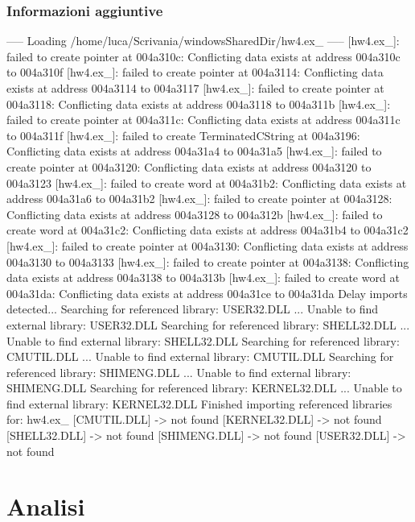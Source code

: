 \documentclass[a4paper, 12pt]{article}
\begin{document}
\subsubsection{Informazioni aggiuntive}
\begin{spverbatim}
----- Loading /home/luca/Scrivania/windowsSharedDir/hw4.ex_ -----
[hw4.ex_]: failed to create pointer at 004a310c: Conflicting data exists at address 004a310c to 004a310f
[hw4.ex_]: failed to create pointer at 004a3114: Conflicting data exists at address 004a3114 to 004a3117
[hw4.ex_]: failed to create pointer at 004a3118: Conflicting data exists at address 004a3118 to 004a311b
[hw4.ex_]: failed to create pointer at 004a311c: Conflicting data exists at address 004a311c to 004a311f
[hw4.ex_]: failed to create TerminatedCString at 004a3196: Conflicting data exists at address 004a31a4 to 004a31a5
[hw4.ex_]: failed to create pointer at 004a3120: Conflicting data exists at address 004a3120 to 004a3123
[hw4.ex_]: failed to create word at 004a31b2: Conflicting data exists at address 004a31a6 to 004a31b2
[hw4.ex_]: failed to create pointer at 004a3128: Conflicting data exists at address 004a3128 to 004a312b
[hw4.ex_]: failed to create word at 004a31c2: Conflicting data exists at address 004a31b4 to 004a31c2
[hw4.ex_]: failed to create pointer at 004a3130: Conflicting data exists at address 004a3130 to 004a3133
[hw4.ex_]: failed to create pointer at 004a3138: Conflicting data exists at address 004a3138 to 004a313b
[hw4.ex_]: failed to create word at 004a31da: Conflicting data exists at address 004a31ce to 004a31da
Delay imports detected...
Searching for referenced library: USER32.DLL ...
Unable to find external library: USER32.DLL
Searching for referenced library: SHELL32.DLL ...
Unable to find external library: SHELL32.DLL
Searching for referenced library: CMUTIL.DLL ...
Unable to find external library: CMUTIL.DLL
Searching for referenced library: SHIMENG.DLL ...
Unable to find external library: SHIMENG.DLL
Searching for referenced library: KERNEL32.DLL ...
Unable to find external library: KERNEL32.DLL
Finished importing referenced libraries for: hw4.ex_
  [CMUTIL.DLL] -> not found
  [KERNEL32.DLL] -> not found
  [SHELL32.DLL] -> not found
  [SHIMENG.DLL] -> not found
  [USER32.DLL] -> not found

\end{spverbatim}

\newpage
\section{Analisi}
\end{document}
